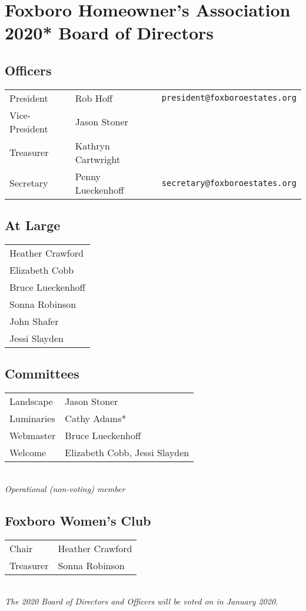 \section{Foxboro Homeowner’s Association 2020* Board of Directors}

\subsection{Officers}
\begin{tabular}{lll}
	President & Rob Hoff & \verb'president@foxboroestates.org' \\
	Vice-President & Jason Stoner & \\
	Treasurer & Kathryn Cartwright & \\
	Secretary & Penny Lueckenhoff & \verb'secretary@foxboroestates.org' \\
\end{tabular}


\subsection{At Large}
\begin{tabular}{l}
	Heather Crawford \\
	Elizabeth Cobb \\
	Bruce Lueckenhoff \\
	Sonna Robinson \\
	John Shafer \\
	Jessi Slayden \\
\end{tabular}

\subsection{Committees}
\begin{tabular}{ll}
	Landscape & Jason Stoner \\
	Luminaries & Cathy Adams* \\
	Webmaster & Bruce Lueckenhoff \\
	Welcome	& Elizabeth Cobb, Jessi Slayden \\
\end{tabular}
\\

{\it *Operational (non-voting) member }

\subsection{Foxboro Women’s Club}
\begin{tabular}{ll}
	Chair & Heather Crawford \\
	Treasurer & Sonna Robinson \\
\end{tabular}
\\

{\it *The 2020 Board of Directors and Officers will be voted on in
January 2020. }


